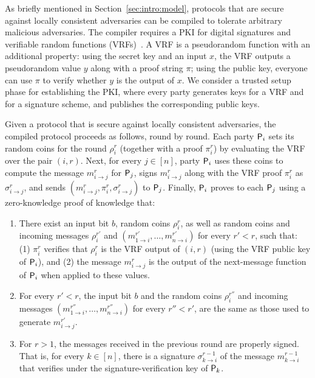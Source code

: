 As briefly mentioned in Section~\ref{sec:intro:model}, protocols that are secure against locally consistent adversaries can be compiled to tolerate arbitrary malicious adversaries.
The compiler requires a PKI for digital signatures and verifiable random functions (VRFs)~\cite{MRV99}. A VRF is a pseudorandom function with an additional property: using the secret key and an input $x$, the VRF outputs a pseudorandom value $y$ along with a proof string $\pi$; using the public key, everyone can use $\pi$ to verify whether $y$ is the output of $x$. We consider a trusted setup phase for establishing the PKI, where every party generates keys for a VRF and for a signature scheme, and publishes the corresponding public keys.

Given a protocol that is secure against locally consistent adversaries, the compiled protocol proceeds as follows, round by round.
Each party $\mathsf{P}_i$ sets its random coins for the \rth round $\rho_i^r$ (together with a proof $\pi_i^r$) by evaluating the VRF over the pair $(i,r)$.
Next, for every $j\in[n]$, party $\mathsf{P}_i$ uses these coins to compute the message $m^r_{i\to j}$ for $\mathsf{P}_j$, signs $m^r_{i\to j}$ along with the VRF proof $\pi^r_i$ as $\sigma^r_{i\to j}$, and sends $(m^r_{i\to j},\pi_i^r,\sigma^r_{i\to j})$ to $\mathsf{P}_j$.
Finally, $\mathsf{P}_i$ proves to each $\mathsf{P}_j$ using a zero-knowledge proof of knowledge that:
\begin{enumerate}
    \item
    There exist an input bit $b$, random coins $\rho_i^r$, as well as random coins and incoming messages $\rho^{r'}_i$ and $(m^{r'}_{1\to i},\ldots,m^{r'}_{n\to i})$ for every $r'<r$, such that: (1) $\pi_i^r$ verifies that $\rho_i^r$ is the VRF output of $(i,r)$ (using the VRF public key of $\mathsf{P}_i$), and (2) the message $m^r_{i\to j}$ is the output of the next-message function of $\mathsf{P}_i$ when applied to these values.
    \item
    For every $r'<r$, the input bit $b$ and the random coins $\rho^{r''}_i$ and incoming messages $(m^{r''}_{1\to i},\ldots,m^{r''}_{n\to i})$ for every $r''<r'$, are the same as those used to generate $m^{r'}_{i\to j}$.
    \item
    For $r>1$, the messages received in the previous round are properly signed. That is, for every $k\in[n]$, there is a signature $\sigma^{r-1}_{k\to i}$ of the message $m^{r-1}_{k\to i}$ that verifies under the signature-verification key of $\mathsf{P}_k$.
\end{enumerate}

